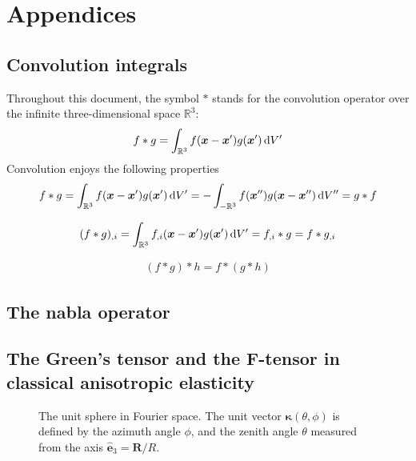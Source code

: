 
\appendix
\chapter{Appendices}


\section{Convolution integrals}
Throughout this document, the symbol $*$ stands for the convolution operator over the infinite three-dimensional space $\mathbb{R}^3$:
\begin{align}
f*g=\int_{\mathbb{R}^3}f(\bm x-\bm x')g(\bm x')\, \text{d}V'
\end{align}
Convolution enjoys the following properties
\begin{align}
f*g=\int_{\mathbb{R}^3}f(\bm x-\bm x')g(\bm x')\, \text{d}V'=-\int_{-\mathbb{R}^3}f(\bm x'')g(\bm x-\bm x'')\, \text{d}V''=g*f
\end{align}

\begin{align}
(f*g)_{,i}=\int_{\mathbb{R}^3}f_{,i}(\bm x-\bm x')g(\bm x')\, \text{d}V'=f_{,i}*g=f*g_{,i}
\end{align}

\begin{align}
(f*g)*h=f*(g*h)
\end{align}

\section{The nabla operator}


\section{The Green's  tensor and the F-tensor in classical  anisotropic elasticity}

\begin{figure}[t]
\centering

\caption{The unit sphere in Fourier space. The unit vector $\bm \kappa(\theta,\phi)$ is defined by the azimuth angle $\phi$, and the  zenith angle $\theta$  measured from the axis $\hat{\bm e}_3=\bm R/R$.}
\label{kSpace}
\end{figure}

